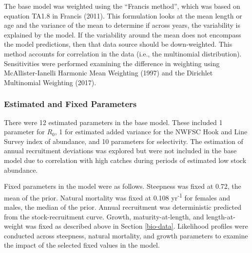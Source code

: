 \documentclass[11pt,
  english,
  a4paper,
]{article}
\begin{document}

The base model was weighted using the ``Francis method'', which was based on equation TA1.8 in Francis {(2011)\leavevmode\tagmcend\tagstructend}. This formulation looks at the mean length or age and the variance of the mean to determine if across years, the variability is explained by the model. If the variability around the mean does not encompass the model predictions, then that data source should be down-weighted. This method accounts for correlation in the data (i.e., the multinomial distribution). Sensitivities were performed examining the difference in weighting using McAllister-Ianelli Harmonic Mean Weighting {(1997)\leavevmode\tagmcend\tagstructend} and the Dirichlet Multinomial Weighting {(2017)\leavevmode\tagmcend\tagstructend}.

\leavevmode\tagmcend\tagstructend\par


\hypertarget{estimated-and-fixed-parameters}{%
\subsubsection{Estimated and Fixed Parameters}\label{estimated-and-fixed-parameters}}

\leavevmode\tagmcend\tagstructend


There were 12 estimated parameters in the base model. These included 1 parameter for {\(R_0\)\leavevmode\tagmcend\tagstructend}, 1 for estimated added variance for the NWFSC Hook and Line Survey index of abundance, and 10 parameters for selectivity. The estimation of annual recruitment deviations was explored but were not included in the base model due to correlation with high catches during periods of estimated low stock abundance.

\leavevmode\tagmcend\tagstructend\par


Fixed parameters in the model were as follows. Steepness was fixed at 0.72, the mean of the prior. Natural mortality was fixed at 0.108 yr\textsuperscript{-1} for females and males, the median of the prior. Annual recruitment was deterministic predicted from the stock-recruitment curve. Growth, maturity-at-length, and length-at-weight was fixed as described above in Section \ref{bio-data}. Likelihood profiles were conducted across steepness, natural mortality, and growth parameters to examine the impact of the selected fixed values in the model.
\end{document}
